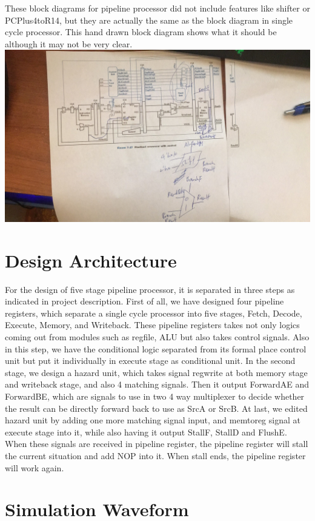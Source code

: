 \documentclass{article}
\begin{document}
\newline
These block diagrams for pipeline processor did not include features like shifter or PCPlus4toR14, but they are actually the same
as the block diagram in single cycle processor. This hand drawn block diagram shows what it should be although it may not be very clear.
\newline
\includegraphics[width=1.0\textwidth]{hdbd.jpg}

\section{Design Architecture}

For the design of five stage pipeline processor, it is separated in three steps as indicated in project description.
\newline
First of all, we have designed four pipeline registers, which separate a single cycle processor into five stages, Fetch, Decode, Execute, Memory, and Writeback. These pipeline registers takes not only logics coming out from modules such as regfile, ALU but also takes control signals. Also in this step, we have the conditional logic separated from its formal place control unit but put it individually in execute  stage as conditional unit.
\newline
In the second stage, we design a hazard unit, which takes signal regwrite at both memory stage and writeback stage, and also 4 matching signals. Then it output ForwardAE and ForwardBE, which are signals to use in two 4 way multiplexer to decide whether the result can be directly forward back to use as SrcA or SrcB.
\newline
At last, we edited hazard unit by adding one more matching signal input, and memtoreg signal at execute stage into it, while also having it output StallF, StallD and FlushE. When these signals are received in pipeline register, the pipeline register will stall the current situation and add NOP into it. When stall ends, the pipeline register will work again.

\section{Simulation Waveform}
\end{document}
